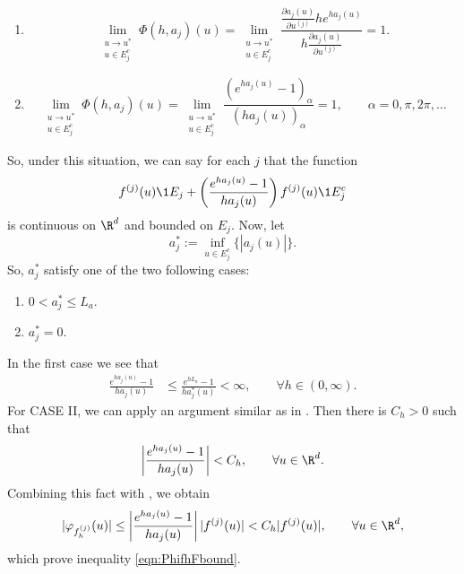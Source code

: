 \documentclass[3p]{elsarticle}
\theoremstyle{definition}
\theoremstyle{plain}%
\theoremstyle{remark}
\begin{document}
\begin{pf}
	\begin{enumerate}[C{A}SE I:]
		\item
			\begin{equation}\label{eqn:ajSingularityCasei}
				\lim_{
					\substack{
						u \to u^*\\ 
						u\in E_j^c
					}
				}
				\Phi(h,a_j)(u) =
				\lim_{
					\substack{
						u \to u^*\\ 
						u\in E_j^c
					}
				}	
				\frac{\frac{\partial a_j(u)}{\partial u^{(j)}} 
					h e^{h a_j(u)} 
				}{
					h\frac{\partial a_j(u)}{\partial u^{(j)}}
				}=1.
			\end{equation}	
		\item
			\begin{equation}\label{eqn:ajSingularityCaseii}
			\lim_{
				\substack{
					u \to u^*\\ 
					u\in E_j^c
				}
			}
			\Phi(h,a_j)(u) 
			=
			\lim_{
				\substack{
					u \to u^*\\ 
					u\in E_j^c
				}
			}	
			\frac{
				\left(
					 e^{h a_j(u)} - 1
				 \right)_{\alpha}
			}{
				\left(
					h a_j(u)
				\right)_{\alpha}
			}	=	1, \qquad \alpha = 0,\pi, 2\pi,\dots
		\end{equation}	
	\end{enumerate}
	So, under this situation, we can say for each $j$ that the function
	\begin{equation*}
		f^{(j)}(u) \1{E_j} +
		\left(
			\frac{e^{ha_j(u)}-1}{ha_j(u)}
		\right)
		f^{(j)}(u) \1{E_j^c}
	\end{equation*}
	is continuous on $\R^d$ and bounded on $E_j$.
	Now, let
		$$
			a^*_j:= \inf_{u\in E_j^c}
			\{
				|a_j(u)|
			\}.
		$$
	So, $a^*_j$ satisfy one of the two following cases:
	\begin{enumerate}[C{A}SE I:]
		\item
			$
				\displaystyle
				0 < a_j^*\leq L_a. 
			$
		\item
			$a_j^*=0$.
	\end{enumerate}
	In the first case we see that
	\begin{align*}
		\frac{e^{h a_j(u)}-1}{ha_j(u)}
		& \leq
			\frac{e^{h L_a}-1}{ha^*_j(u)} <\infty,
		\qquad \forall h\in (0,\infty ).
	\end{align*}
	For CASE II, we can apply an argument similar as in .
	Then there is  $C_h>0$ such that
	\begin{equation}\label{eqn:PhiBound}
		\left|
			\frac{e^{ha_j(u)}-1}{ha_j(u)}
		\right| < C_h,
		\qquad \forall u \in \R^d.
	\end{equation}	
%		
	Combining this fact with , we obtain
	$$
		|\varphi_{f_h^{(j)}}(u)|
		\leq
		\left|
			\frac{e^{ha_j(u)}-1}{ha_j(u)}
		\right||f^{(j)}(u)| < C_h |f^{(j)}(u)|,
		\qquad \forall u \in \R^d,
	$$
	which prove inequality \eqref{eqn:PhifhFbound}.
	

\end{pf}
\end{document}
